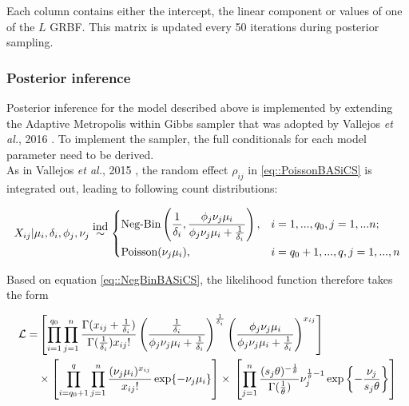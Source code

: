 Each column contains either the intercept, the linear component or values of one of the $L$ GRBF. This matrix is updated every 50 iterations during posterior sampling.

\subsubsection{Posterior inference}

Posterior inference for the model described above is implemented by extending the Adaptive Metropolis within Gibbs sampler \citep{Roberts2009} that was adopted by Vallejos \emph{et al.}, 2016 \cite{Vallejos2016}. To implement the sampler, the full conditionals for each model parameter need to be derived. \\

As in Vallejos \emph{et al.}, 2015 \cite{Vallejos2015BASiCS}, the random effect $\rho_{ij}$ in \ref{eq::PoissonBASiCS} is integrated out, leading to following count distributions:

\begin{equation} \label{eq::NegBinBASiCS}
 X_{ij}|\mu_i,\delta_i,\phi_j,\nu_j \stackrel{\mbox{ind}}{\sim}
 \left\lbrace
  \begin{aligned}
    &\text{Neg-Bin}\left(\frac{1}{\delta_i},\frac{\phi_j\nu_j\mu_i}{\phi_j\nu_j\mu_i+\frac{1}{\delta_i}}\right), && i=1,...,q_0,j=1,...n;  \\ 
    &\text{Poisson}(\nu_j\mu_i), && i=q_0+1,...,q,j=1,...,n        
  \end{aligned}
\right.
\end{equation}

Based on equation \eqref{eq::NegBinBASiCS}, the likelihood function therefore takes the form

\begin{align} \label{eq::loglik}
\mathcal{L} = & \left[\prod_{i=1}^{q_0}\prod_{j=1}^n\frac{\Gamma(x_{ij}+\frac{1}{\delta_i})}{\Gamma(\frac{1}{\delta_i})x_{ij}!}\left(\frac{\frac{1}{\delta_i}}{\phi_j\nu_j\mu_i+\frac{1}{\delta_i}}\right)^\frac{1}{\delta_i}\left(\frac{\phi_j\nu_j\mu_i}{\phi_j\nu_j\mu_i+\frac{1}{\delta_i}}\right)^{x_{ij}}\right] \nonumber\\ 
&\times\left[\prod_{i=q_0+1}^{q}\prod_{j=1}^n\frac{(\nu_j\mu_i)^{x_{ij}}}{x_{ij}!}\exp\lbrace-\nu_j\mu_i\rbrace\right]\times{}\left[\prod_{j=1}^n\frac{(s_j\theta)^{-\frac{1}{\theta}}}{\Gamma(\frac{1}{\theta})}\nu_j^{\frac{1}{\theta}-1}\exp\left\lbrace-\frac{\nu_j}{s_j\theta}\right\rbrace\right]
\end{align} 

